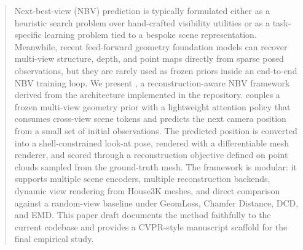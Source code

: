 \begin{abstract}
Next-best-view (NBV) prediction is typically formulated either as a heuristic search problem over hand-crafted visibility utilities or as a task-specific learning problem tied to a bespoke scene representation. Meanwhile, recent feed-forward geometry foundation models can recover multi-view structure, depth, and point maps directly from sparse posed observations, but they are rarely used as frozen priors inside an end-to-end NBV training loop. We present \method, a reconstruction-aware NBV framework derived from the architecture implemented in the \codebase repository. \method couples a frozen multi-view geometry prior with a lightweight attention policy that consumes cross-view scene tokens and predicts the next camera position from a small set of initial observations. The predicted position is converted into a shell-constrained look-at pose, rendered with a differentiable mesh renderer, and scored through a reconstruction objective defined on point clouds sampled from the ground-truth mesh. The framework is modular: it supports multiple scene encoders, multiple reconstruction backends, dynamic view rendering from House3K meshes, and direct comparison against a random-view baseline under GeomLoss, Chamfer Distance, DCD, and EMD. This paper draft documents the method faithfully to the current codebase and provides a CVPR-style manuscript scaffold for the final empirical study.
\end{abstract}
